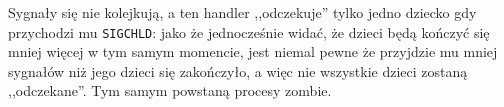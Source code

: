 Sygnały się nie kolejkują, a ten handler ,,odczekuje'' tylko jedno dziecko gdy przychodzi mu \texttt{SIGCHLD}: jako że jednocześnie widać, że dzieci będą kończyć się mniej więcej w tym samym momencie, jest niemal pewne że przyjdzie mu mniej sygnałów niż jego dzieci się zakończyło, a więc nie wszystkie dzieci zostaną ,,odczekane''. Tym samym powstaną procesy zombie.